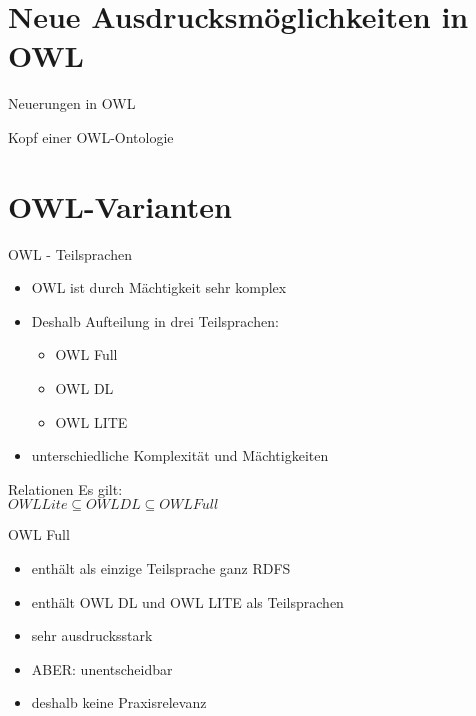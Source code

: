 \documentclass{beamer}
\begin{document}

\section{Neue Ausdrucksmöglichkeiten in OWL}
\begin{frame}{Neuerungen in OWL}

\end{frame}

\begin{frame}{Kopf einer OWL-Ontologie}

\end{frame}




\section{OWL-Varianten}
\begin{frame}{OWL - Teilsprachen}
\begin{itemize}
	\item OWL ist durch Mächtigkeit sehr komplex
	\item Deshalb Aufteilung in drei Teilsprachen:
\begin{itemize}
	\item OWL Full
	\item OWL DL
	\item OWL LITE
\end{itemize}
	\item unterschiedliche Komplexität und Mächtigkeiten
\end{itemize}
\begin{block}{Relationen}
	Es gilt:\\
	$OWL Lite \subseteq OWL DL \subseteq OWL Full$
\end{block}
\end{frame}

%
\begin{frame}{OWL Full}
\begin{itemize}
	\item enthält als einzige Teilsprache \alert{ganz} RDFS
	\item enthält OWL DL und OWL LITE als Teilsprachen
	\item sehr ausdrucksstark
	\item ABER: \alert{unentscheidbar}
	\item deshalb keine Praxisrelevanz
\end{itemize}
\end{frame}
\end{document}
